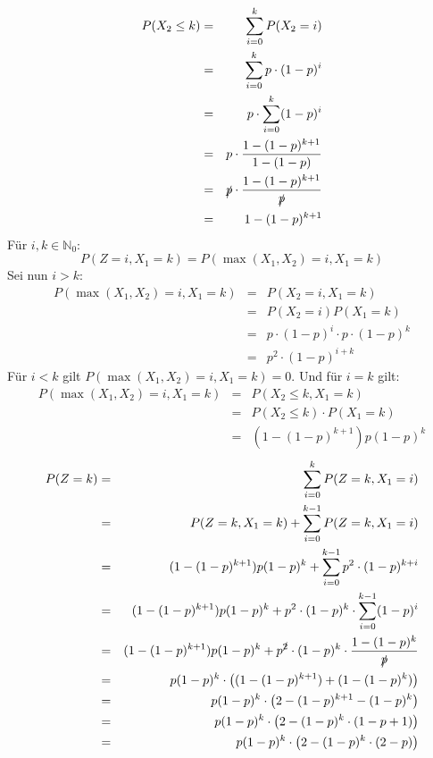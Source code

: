 \begin{Answer}
	\Question
	\begin{eqnarray*}
		P(X_2\leq k)&=&\sum_{i=0}^{k}P(X_2=i)\\
		&=&\sum_{i=0}^{k}p\cdot (1-p)^{i}\\
		&=&p\cdot\sum_{i=0}^{k} (1-p)^{i}\\
		&=&p\cdot \frac{1-(1-p)^{k+1}}{1-(1-p)}\\
		&=&\slashed{p}\cdot \frac{1-(1-p)^{k+1}}{\slashed{p}}\\
		&=&1-(1-p)^{k+1}
	\end{eqnarray*}
\Question Für $i,k\in\mathbb{N}_0$:
\begin{equation*}
	P(Z=i,X_1=k)=P(\max(X_1,X_2)=i,X_1=k)
\end{equation*}
Sei nun $i>k$:
\begin{eqnarray*}
	P(\max(X_1,X_2)=i,X_1=k)&=&P(X_2=i,X_1=k)\\
	&=&P(X_2=i)P(X_1=k)\\
	&=&p\cdot (1-p)^{i}\cdot p \cdot (1-p)^k\\
	&=&p^2\cdot (1-p)^{i+k}
\end{eqnarray*}
Für $i<k$ gilt $P(\max(X_1,X_2)=i,X_1=k)=0$. Und für $i=k$ gilt:
\begin{eqnarray*}
	P(\max(X_1,X_2)=i,X_1=k)&=&P(X_2\leq k,X_1=k)\\
	&=&P(X_2\leq k)\cdot P(X_1=k)\\
	&=&(1-(1-p)^{k+1})p(1-p)^k
\end{eqnarray*}
\Question 
\begin{eqnarray*}
	P(Z=k)&=&\sum_{i=0}^kP(Z=k,X_1=i)\\
	&=&P(Z=k,X_1=k)+\sum_{i=0}^{k-1}P(Z=k,X_1=i)\\
	&=&(1-(1-p)^{k+1})p(1-p)^k+\sum_{i=0}^{k-1}p^2\cdot (1-p)^{k+i}\\
	&=&(1-(1-p)^{k+1})p(1-p)^k+p^2\cdot (1-p)^k\cdot\sum_{i=0}^{k-1}(1-p)^{i}\\
	&=&(1-(1-p)^{k+1})p(1-p)^k+p^{\slashed{2}}\cdot (1-p)^k\cdot\frac{1-(1-p)^k}{\slashed{p}}\\
	&=&p(1-p)^k\cdot\left((1-(1-p)^{k+1})+(1-(1-p)^k)\right)\\
	&=& p(1-p)^k\cdot\left(2-(1-p)^{k+1}-(1-p)^k\right)\\
	&=&p(1-p)^k\cdot\left(2-(1-p)^k\cdot(1-p+1)\right)\\
	&=&p(1-p)^k\cdot\left(2-(1-p)^k\cdot(2 - p)\right)
\end{eqnarray*}
\end{Answer}


